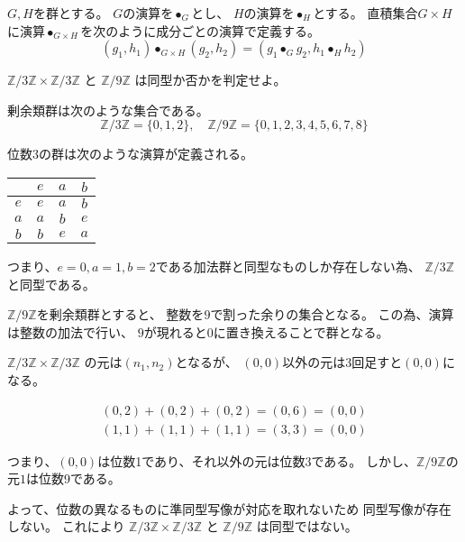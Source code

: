 \documentclass[12pt,b5paper]{ltjsarticle}
\begin{document}
\newpage

\hrulefill

$G,H$を群とする。
$G$の演算を$\bullet_G$とし、
$H$の演算を$\bullet_H$とする。
直積集合$G\times H$に演算$\bullet_{G\times H}$を次のように成分ごとの演算で定義する。
\begin{equation}
 (g_1,h_1) \bullet_{G\times H} (g_2,h_2) = (g_1 \bullet_G g_2, h_1 \bullet_H h_2)
\end{equation}

$\mathbb{Z}/3\mathbb{Z}\times \mathbb{Z}/3\mathbb{Z}$
と
$\mathbb{Z}/9\mathbb{Z}$
は同型か否かを判定せよ。


\dotfill

剰余類群は次のような集合である。
\begin{equation}
 \mathbb{Z}/3\mathbb{Z} =\{0,1,2\},\quad
 \mathbb{Z}/9\mathbb{Z} =\{0,1,2,3,4,5,6,7,8\}
\end{equation}

位数3の群は次のような演算が定義される。
\begin{center}
 \begin{tabular}{c||c|c|c}
  & $e$ & $a$ & $b$ \\
  \hline \hline
  $e$ & $e$ & $a$ & $b$ \\
  \hline
  $a$ & $a$ & $b$ & $e$ \\
  \hline
  $b$ & $b$ & $e$ & $a$
 \end{tabular}
\end{center}
つまり、$e=0,a=1,b=2$である加法群と同型なものしか存在しない為、
$\mathbb{Z}/3\mathbb{Z}$と同型である。

$\mathbb{Z}/9\mathbb{Z}$を剰余類群とすると、
整数を$9$で割った余りの集合となる。
この為、演算は整数の加法で行い、
$9$が現れると$0$に置き換えることで群となる。


$\mathbb{Z}/3\mathbb{Z}\times\mathbb{Z}/3\mathbb{Z}$
の元は$(n_1,n_2)$となるが、
$(0,0)$以外の元は3回足すと$(0,0)$になる。

\begin{gather}
 (0,2)+(0,2)+(0,2)=(0,6)=(0,0)\\
 (1,1)+(1,1)+(1,1)=(3,3)=(0,0)
\end{gather}

つまり、$(0,0)$は位数1であり、それ以外の元は位数3である。
しかし、$\mathbb{Z}/9\mathbb{Z}$の元$1$は位数9である。

よって、位数の異なるものに準同型写像が対応を取れないため
同型写像が存在しない。
これにより
$\mathbb{Z}/3\mathbb{Z}\times\mathbb{Z}/3\mathbb{Z}$
と
$\mathbb{Z}/9\mathbb{Z}$
は同型ではない。
\end{document}
